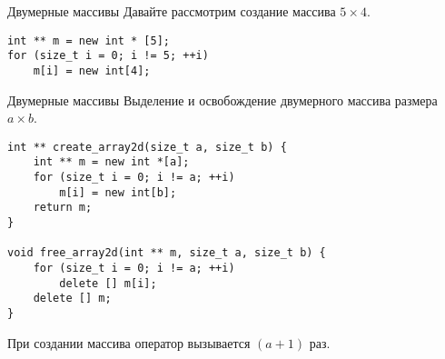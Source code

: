 \documentclass{beamer}
\begin{document}
\begin{frame}[fragile]{Двумерные массивы}
    Давайте рассмотрим создание массива $5\times 4$.
    
\begin{center}
        \begin{lstlisting}
int ** m = new int * [5];
for (size_t i = 0; i != 5; ++i)
    m[i] = new int[4];
        \end{lstlisting}
\end{center}
\end{frame}

\begin{frame}[fragile]{Двумерные массивы}
    Выделение и освобождение двумерного массива размера $a\times b$.
        \begin{lstlisting}
int ** create_array2d(size_t a, size_t b) {
    int ** m = new int *[a];
    for (size_t i = 0; i != a; ++i)
        m[i] = new int[b];
    return m;
}

void free_array2d(int ** m, size_t a, size_t b) {
    for (size_t i = 0; i != a; ++i)
        delete [] m[i];
    delete [] m;
}
        \end{lstlisting}
При создании массива оператор  вызывается $(a + 1)$ раз.
\end{frame}
\end{document}
